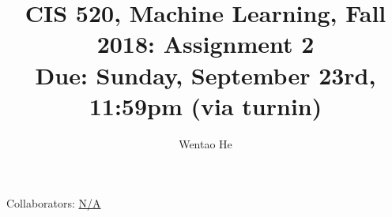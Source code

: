 \documentclass[english]{article}
\title{CIS 520, Machine Learning, Fall 2018: Assignment 2\\
Due: Sunday, September 23rd, 11:59pm (via turnin)}
\author{Wentao He}
\begin{document}
\maketitle

{\normalsize \noindent Collaborators: \underline{N/A}} \\
\end{document}
